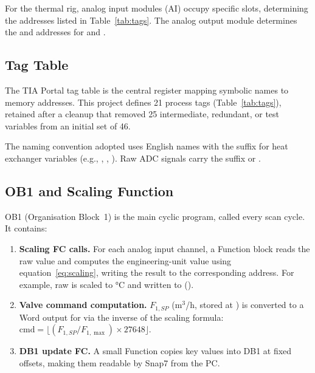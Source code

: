 For the thermal rig, analog input modules (AI) occupy specific slots, determining the
 addresses listed in Table~\ref{tab:tags}. The analog output module determines
the  and  addresses for  and
.

\subsection{Tag Table}

The TIA Portal tag table is the central register mapping symbolic names to memory addresses.
This project defines 21 process tags (Table~\ref{tab:tags}), retained after a cleanup
that removed 25 intermediate, redundant, or test variables from an initial set of 46.

The naming convention adopted uses English names with the suffix  for heat
exchanger variables (e.g., , , ).
Raw ADC signals carry the suffix  or .

\subsection{OB1 and Scaling Function}

OB1 (Organisation Block~1) is the main cyclic program, called every scan cycle. It contains:

\begin{enumerate}[leftmargin=*, itemsep=3pt]
  \item \textbf{Scaling FC calls.} For each analog input channel, a Function block reads
    the raw  value and computes the engineering-unit value using
    equation~\eqref{eq:scaling}, writing the result to the corresponding 
    address. For example, raw  is scaled to \si{\degreeCelsius} and
    written to  ().

  \item \textbf{Valve command computation.} $F_{1,SP}$ (m$^3$/h, stored at )
    is converted to a Word output for  via the inverse of the scaling formula:
    $\text{cmd} = \lfloor(F_{1,SP} / F_{1,\max}) \times 27648\rfloor$.

  \item \textbf{DB1 update FC.} A small Function copies key  values into DB1
    at fixed offsets, making them readable by Snap7 from the PC.
\end{enumerate}

